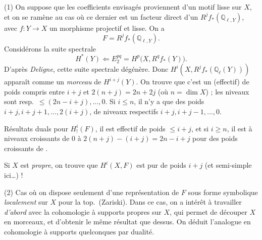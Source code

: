 \documentclass[11pt,a4paper]{article}
\begin{document}
(1) On suppose que les coefficients envisagés proviennent d'un motif lisse sur
$X$, et  on se
ramène au cas où ce dernier est un facteur direct d'un
$R^{j}f_{*}(\mathbb{Q}_{\ell,Y})$, avec $f : Y \to X$ un morphisme projectif
et lisse.  On a
\[
F = R^{j}f_{*}(\mathbb{Q}_{\ell,Y}) .
\]
Considérons la suite spectrale
\[
H^{*}(Y) \Longleftarrow E_{2}^{pq} = H^{p}\bigl(X, R^{q}f_{*}(Y)\bigr) .
\]
D'après \emph{Deligne}, cette suite spectrale dégénère. Donc
$H^{i}(X, R^{j}f_{*}(\mathbb{Q}_{\ell}(Y)))$ 
apparaît comme un \emph{morceau} de $H^{i+j}(Y)$. On trouve que c'est un
 (effectif) de poids compris entre $i+j$ et
$2(n+j) = 2n+2j$ (où $n = \dim X$) ;  les
niveaux sont resp.\ $\leqslant (2n-i+j), \ldots, 0$. Si $i \leqslant n$, il
n'y a que des poids 
$i+j, i+j+1, \ldots, 2(i+j)$, de  niveaux respectifs
 $i+j, i+j-1, \ldots, 0$.

Résultats duals pour $H^{i}_{!}(F)$, il est effectif de poids $\leqslant i+j$,
et  si $i \geqslant n$, il est à niveaux croissants de 0 à
 $2(n+j)-(i+j) = 2n-i+j$ pour des poids croissants de
\ill{}.

Si $X$ est \emph{propre}, on trouve que $H^{i}(X,F)$ est pur de poids $i+j$
(et semi-simple ici…) !

(2) Cas où on dispose seulement d'une représentation de $F$ sous forme
symbolique \emph{localement} sur $X$ pour la top.\ (Zariski). Dans ce cas,
 on a intérêt à travailler \emph{d'abord} avec la cohomologie à
supports propres sur $X$, qui permet de découper $X$ en morceaux, et d'obtenir
le même résultat que dessus. On déduit l'analogue en cohomologie à supports
quelconques par dualité.
\end{document}
